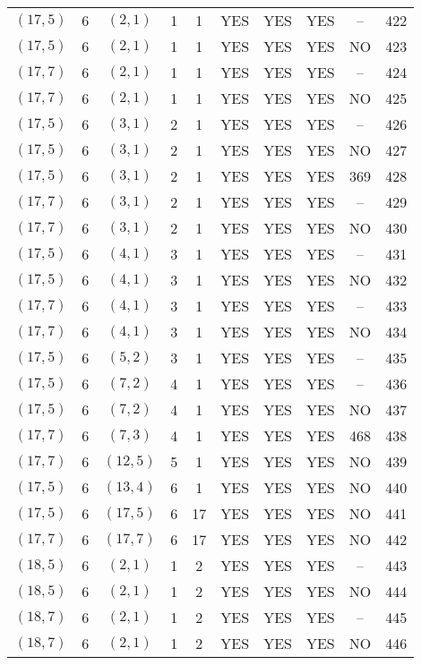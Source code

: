 \begin{longtable}{|c|c|c|c|c|c|c|c|c|c|}
$(17, 5)$ & 6 & $(2, 1)$ & 1 & 1 & YES & YES & YES & -- & 422\\
$(17, 5)$ & 6 & $(2, 1)$ & 1 & 1 & YES & YES & YES & NO & 423\\
$(17, 7)$ & 6 & $(2, 1)$ & 1 & 1 & YES & YES & YES & -- & 424\\
$(17, 7)$ & 6 & $(2, 1)$ & 1 & 1 & YES & YES & YES & NO & 425\\
$(17, 5)$ & 6 & $(3, 1)$ & 2 & 1 & YES & YES & YES & -- & 426\\
$(17, 5)$ & 6 & $(3, 1)$ & 2 & 1 & YES & YES & YES & NO & 427\\
$(17, 5)$ & 6 & $(3, 1)$ & 2 & 1 & YES & YES & YES & 369 & 428\\
$(17, 7)$ & 6 & $(3, 1)$ & 2 & 1 & YES & YES & YES & -- & 429\\
$(17, 7)$ & 6 & $(3, 1)$ & 2 & 1 & YES & YES & YES & NO & 430\\
$(17, 5)$ & 6 & $(4, 1)$ & 3 & 1 & YES & YES & YES & -- & 431\\
$(17, 5)$ & 6 & $(4, 1)$ & 3 & 1 & YES & YES & YES & NO & 432\\
$(17, 7)$ & 6 & $(4, 1)$ & 3 & 1 & YES & YES & YES & -- & 433\\
$(17, 7)$ & 6 & $(4, 1)$ & 3 & 1 & YES & YES & YES & NO & 434\\
$(17, 5)$ & 6 & $(5, 2)$ & 3 & 1 & YES & YES & YES & -- & 435\\
$(17, 5)$ & 6 & $(7, 2)$ & 4 & 1 & YES & YES & YES & -- & 436\\
$(17, 5)$ & 6 & $(7, 2)$ & 4 & 1 & YES & YES & YES & NO & 437\\
$(17, 7)$ & 6 & $(7, 3)$ & 4 & 1 & YES & YES & YES & 468 & 438\\
$(17, 7)$ & 6 & $(12, 5)$ & 5 & 1 & YES & YES & YES & NO & 439\\
$(17, 5)$ & 6 & $(13, 4)$ & 6 & 1 & YES & YES & YES & NO & 440\\
$(17, 5)$ & 6 & $(17, 5)$ & 6 & 17 & YES & YES & YES & NO & 441\\
$(17, 7)$ & 6 & $(17, 7)$ & 6 & 17 & YES & YES & YES & NO & 442\\
$(18, 5)$ & 6 & $(2, 1)$ & 1 & 2 & YES & YES & YES & -- & 443\\
$(18, 5)$ & 6 & $(2, 1)$ & 1 & 2 & YES & YES & YES & NO & 444\\
$(18, 7)$ & 6 & $(2, 1)$ & 1 & 2 & YES & YES & YES & -- & 445\\
$(18, 7)$ & 6 & $(2, 1)$ & 1 & 2 & YES & YES & YES & NO & 446\\

\end{longtable}
